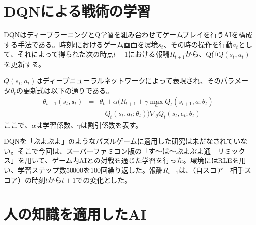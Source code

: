 \documentclass[twocolumn, a4paper]{UECIEresume}
\begin{document}


\section{DQNによる戦術の学習}
DQN\cite{dqn}はディープラーニングとQ学習を組み合わせてゲームプレイを行うAIを構成する手法である。時刻$t$におけるゲーム画面を環境$s_t$、その時の操作を行動$a_t$として、それによって得られた次の時点$t+1$における報酬$R_{t+1}$から、Q値$Q(s_t, a_t)$を更新する。

$Q(s_t, a_t)$はディープニューラルネットワークによって表現され、そのパラメータ$\theta_{t}$の更新式は以下の通りである。
\begin{eqnarray}
\theta_{t+1}(s_t, a_t) & = & \theta_t + \alpha (R_{t+1} + \gamma \max_a Q_t(s_{t+1}, a; \theta_t) \nonumber\\
& & - Q_t(s_t, a_t; \theta_t))\nabla_\theta Q_t(s_t, a_t; \theta_t)
\end{eqnarray}
ここで、$\alpha$は学習係数、$\gamma$は割引係数を表す。


DQNを「ぷよぷよ」のようなパズルゲームに適用した研究は未だなされていない。そこで今回は、スーパーファミコン版の「す〜ぱ〜ぷよぷよ通　リミックス」を用いて、ゲーム内AIとの対戦を通じた学習を行った。環境にはRLE\cite{RLE}を用い、学習ステップ数50000を100回繰り返した。報酬$R_{t+1}$は、（自スコア - 相手スコア）の時刻$t$から$t+1$での変化とした。

\section{人の知識を適用したAI}
\end{document}
